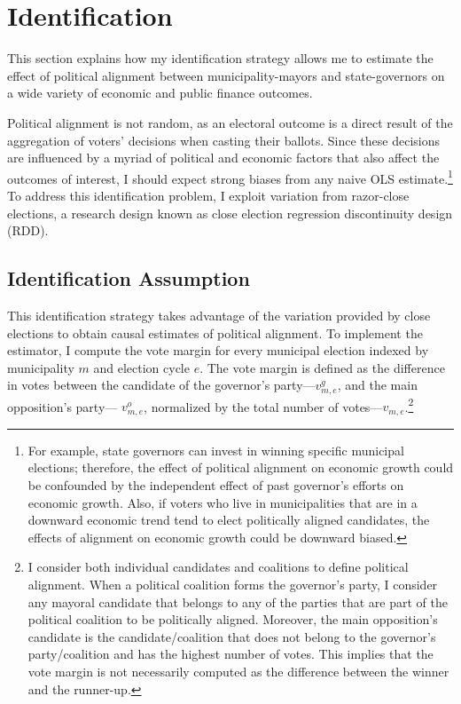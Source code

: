 \documentclass[dv_diss_main.tex]{subfiles}
\begin{document}
\section{Identification}

This section explains how my identification strategy allows me to estimate the effect of political alignment between municipality-mayors and state-governors on a wide variety of economic and public finance outcomes. 

Political alignment is not random,  as an electoral outcome is a direct result of the aggregation of voters' decisions when casting their ballots. Since these decisions are influenced by a myriad of political and economic factors that also affect the outcomes of interest, I should expect strong biases from any naive OLS  estimate.\footnote{For example, state governors can invest in winning specific municipal elections; therefore, the effect of political alignment on economic growth could be confounded by the independent effect of past governor's efforts on economic growth. Also, if voters who live in municipalities that are in a downward economic trend tend to elect politically aligned candidates, the effects of alignment on economic growth could be downward biased.}  To address this identification problem, I exploit variation from razor-close elections, a research design known as close election regression discontinuity design (RDD). 

\subsection{Identification Assumption}
This identification strategy takes advantage of the variation provided by close elections to obtain causal estimates of political alignment.  To implement the estimator, I compute the vote margin for every municipal election indexed by municipality $m$ and election cycle $e$. The vote margin is defined as the difference in votes between the candidate of the governor's party---$v^g_{m,e}$, and the main opposition's party--- $v^o_{m,e}$, normalized by the total number of votes---$v_{m,e}$.\footnote{I consider both individual candidates and coalitions to define political alignment. When a political coalition forms the governor's party, I consider any mayoral candidate that belongs to any of the parties that are part of the political coalition to be politically aligned. Moreover, the main opposition's candidate is the candidate/coalition that does not belong to the governor's party/coalition and has the highest number of votes. This implies that the vote margin is not necessarily computed as the difference between the winner and the runner-up.} 
\end{document}
